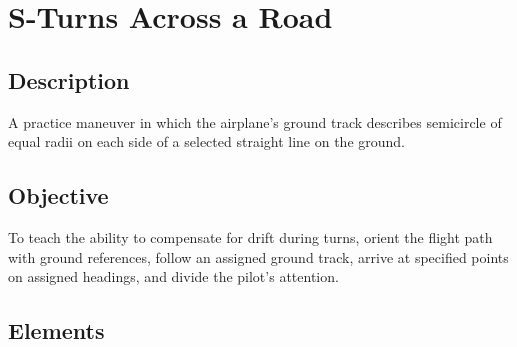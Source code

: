 \section{S-Turns Across a Road}

\subsection{Description}

A practice maneuver in which the airplane's ground track describes semicircle
of equal radii on each side of a selected straight line on the ground.

\subsection{Objective}

To teach the ability to compensate for drift during turns, orient the flight
path with ground references, follow an assigned ground track, arrive at
specified points on assigned headings, and divide the pilot's attention.

\subsection{Elements}

